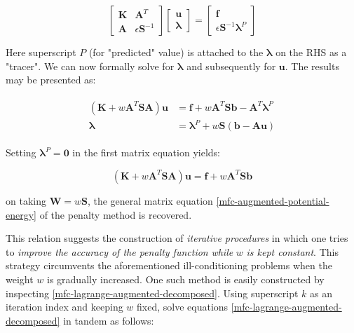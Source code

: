 \documentclass[10pt,b5paper,titlepage]{book}
\newcommand{\m}{\mathbf}
\newcommand{\M}{\pmb}
\newenvironment{eqarray}
{
    \begin{eqnarray}
        \begin{aligned}
}
{
        \end{aligned}
    \end{eqnarray}
}
\begin{document}
\begin{equation}\label{mfc-lagrangian}
    \begin{bmatrix}
        \m{K} & \m{A}^T \\
        \m{A} & \epsilon \m{S}^{-1}
    \end{bmatrix}
    \begin{bmatrix}
        \m{u} \\
        \M{\lambda}
    \end{bmatrix}
    = \begin{bmatrix}
        \m{f} \\
        \epsilon \m{S}^{-1} \M{\lambda}^P
    \end{bmatrix}
\end{equation}

Here superscript $ P $ (for "predicted" value) is attached to the $ \M{\lambda} $
on the RHS as a "tracer". We can now formally solve for $ \M{\lambda} $
and subsequently for $ \m{u} $. The results may be presented as:

\begin{eqarray}\label{mfc-lagrange-augmented-decomposed}
    \left( \m{K} + w \m{A}^T \m{S} \m{A} \right) \m{u}
    &= \m{f} + w \m{A}^T \m{S} \m{b} - \m{A}^T \M{\lambda}^P \\
    \M{\lambda} &= \M{\lambda}^P + w \m{S} \left(\m{b} - \m{A} \m{u} \right)
\end{eqarray}

Setting $ \M{\lambda}^P  = \m{0} $ in the first matrix equation yields:

\begin{equation}
    \left( \m{K} + w \m{A}^T \m{S} \m{A} \right) \m{u}
    = \m{f} + w \m{A}^T \m{S} \m{b}
\end{equation}

on taking $ \m{W} = w \m{S} $, the general matrix equation
\eqref{mfc-augmented-potential-energy} of the penalty method is recovered.

This relation suggests the construction of \textit{iterative procedures}
in which one tries to \textit{improve the accuracy of the penalty function}
\textit{while} $ w $ \textit{is kept constant}. This strategy circumvents the
aforementioned ill-conditioning problems when the weight $ w $ is gradually
increased. One such method is easily constructed by inspecting
\eqref{mfc-lagrange-augmented-decomposed}. Using superscript $ k $ as an
iteration index and keeping $ w $ fixed, solve equations
\eqref{mfc-lagrange-augmented-decomposed} in tandem as follows:
\end{document}
